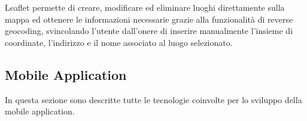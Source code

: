 \documentclass[../manuale-sviluppatore.tex]{subfiles}
\begin{document}
Leaflet permette di creare, modificare ed eliminare luoghi direttamente sulla mappa ed ottenere le informazioni necessarie grazie alla funzionalità di reverse geocoding, svincolando l'utente dall'onere di inserire manualmente l'insieme di coordinate, l'indirizzo e il nome associato al luogo selezionato.
\newpage

\subsection{Mobile Application}%
\label{sub:mobile_app}

In questa sezione sono descritte tutte le tecnologie coinvolte per lo sviluppo della mobile application.

\end{document}

